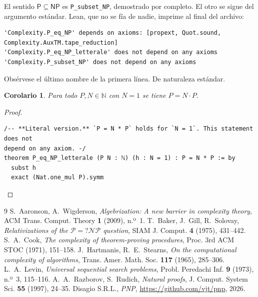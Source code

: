 \documentclass[11pt,a4paper]{amsart}
\newtheorem{corollario}[teorema]{Corolario}
\theoremstyle{remark}
\begin{document}
El sentido $\mathsf{P} \subseteq \mathsf{NP}$ es \texttt{P\_subset\_NP},
demostrado por completo. El otro se sigue del argumento estándar. Lean, que no
se fía de nadie, imprime al final del archivo:

\begin{listato}[\scriptsize]
\begin{verbatim}
'Complexity.P_eq_NP' depends on axioms: [propext, Quot.sound, Complexity.AuxTM.tape_reduction]
'Complexity.P_eq_NP_letterale' does not depend on any axioms
'Complexity.P_subset_NP' does not depend on any axioms
\end{verbatim}
\end{listato}

\noindent Obsérvese el último nombre de la primera línea. De naturaleza estándar.

\begin{corollario}\label{cor:lett}
Para todo $P, N \in \mathbb{N}$ con $N = 1$ se tiene $P = N \cdot P$.
\end{corollario}

\begin{proof}
\begin{listato}
\begin{verbatim}
/-- **Literal version.** `P = N * P` holds for `N = 1`. This statement does not
depend on any axiom. -/
theorem P_eq_NP_letterale (P N : ℕ) (h : N = 1) : P = N * P := by
  subst h
  exact (Nat.one_mul P).symm
\end{verbatim}
\end{listato}
\end{proof}

\begin{thebibliography}{9}
 S.~Aaronson, A.~Wigderson,
  \emph{Algebrization: A new barrier in complexity theory},
  ACM Trans. Comput. Theory \textbf{1} (2009), n.º~1.
 T.~Baker, J.~Gill, R.~Solovay,
  \emph{Relativizations of the $\mathcal{P} =? \mathcal{NP}$ question},
  SIAM J. Comput. \textbf{4} (1975), 431--442.
 S.~A.~Cook,
  \emph{The complexity of theorem-proving procedures},
  Proc. 3rd ACM STOC (1971), 151--158.
 J.~Hartmanis, R.~E.~Stearns,
  \emph{On the computational complexity of algorithms},
  Trans. Amer. Math. Soc. \textbf{117} (1965), 285--306.
 L.~A.~Levin,
  \emph{Universal sequential search problems},
  Probl. Peredachi Inf. \textbf{9} (1973), n.º~3, 115--116.
 A.~A.~Razborov, S.~Rudich,
  \emph{Natural proofs},
  J. Comput. System Sci. \textbf{55} (1997), 24--35.
 Disagio S.R.L.,
  \emph{PNP}, \url{https://github.com/vjt/pnp}, 2026.
\end{thebibliography}
\end{document}
